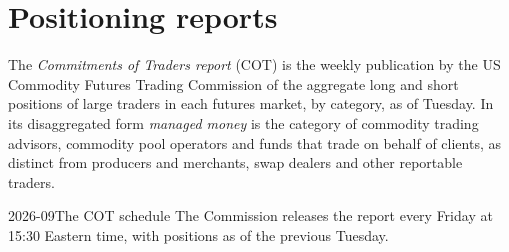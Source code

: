 \section{Positioning reports}

\begin{definition}\label{def:m3:agriculturals-and-softs:cot}
The \emph{Commitments of Traders report} (COT) is the weekly
publication by the US Commodity Futures Trading Commission of the aggregate long and short positions
of large traders in each futures market, by category, as of Tuesday. In its disaggregated form
\emph{managed money} is the category of commodity trading advisors, commodity
pool operators and funds that trade on behalf of clients, as distinct from producers and merchants,
swap dealers and other reportable traders.
\end{definition}

\begin{dated}{2026-09}{The COT schedule}\label{dat:m3:agriculturals-and-softs:cot}
The Commission releases the report every Friday at 15:30 Eastern time, with positions as of the
previous Tuesday.
\end{dated}

